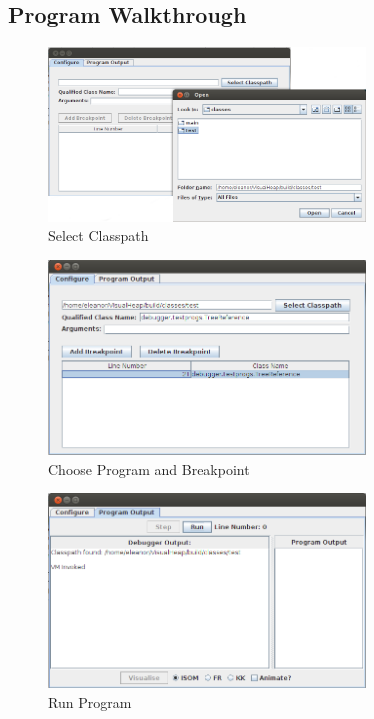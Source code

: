 \documentclass[11pt, a4paper]{report}
\begin{document}
\begin{appendices}

\chapter{Program Walkthrough}

\begin{figure}[h]
        \centering
        \includegraphics[width=0.75\textwidth]{images/final/walk1.png}
        \caption{Select Classpath}
\end{figure}

\begin{figure}[h]
        \centering
        \includegraphics[width=0.75\textwidth]{images/final/walk2.png}
        \caption{Choose Program and Breakpoint}
\end{figure}

\begin{figure}[h]
        \centering
        \includegraphics[width=0.75\textwidth]{images/final/walk3.png}
        \caption{Run Program}
\end{figure}


\end{appendices}
\end{document}
